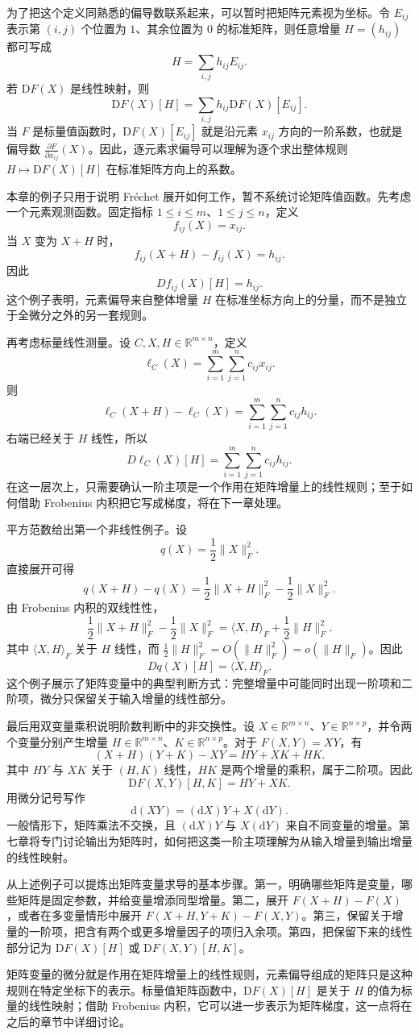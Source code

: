 为了把这个定义同熟悉的偏导数联系起来，可以暂时把矩阵元素视为坐标。令 \(E_{ij}\) 表示第 \((i,j)\) 个位置为 \(1\)、其余位置为 \(0\) 的标准矩阵，则任意增量 \(H=(h_{ij})\) 都可写成 \[H=\sum_{i,j}h_{ij}E_{ij}.\]
若 \(\mathrm{D}F(X)\) 是线性映射，则
\[
\mathrm{D}F(X)[H]=\sum_{i,j}h_{ij}\mathrm{D}F(X)[E_{ij}].
\]
当 \(F\) 是标量值函数时，\(\mathrm{D}F(X)[E_{ij}]\) 就是沿元素 \(x_{ij}\) 方向的一阶系数，也就是偏导数 \(\frac{\partial F}{\partial x_{ij}}(X)\)。因此，逐元素求偏导可以理解为逐个求出整体规则 \(H\mapsto \mathrm{D}F(X)[H]\) 在标准矩阵方向上的系数。

本章的例子只用于说明 Fréchet 展开如何工作，暂不系统讨论矩阵值函数。先考虑一个元素观测函数。固定指标 \(1\le i\le m\)、\(1\le j\le n\)，定义
\[
f_{ij}(X)=x_{ij}.
\]
当 \(X\) 变为 \(X+H\) 时，
\[
f_{ij}(X+H)-f_{ij}(X)=h_{ij}.
\]
因此
\[
Df_{ij}(X)[H]=h_{ij}.
\]
这个例子表明，元素偏导来自整体增量 \(H\) 在标准坐标方向上的分量，而不是独立于全微分之外的另一套规则。

再考虑标量线性测量。设 \(C,X,H\in\mathbb{R}^{m\times n}\)，定义
\[
\ell_C(X)=\sum_{i=1}^m\sum_{j=1}^n c_{ij}x_{ij}.
\]
则
\[
\ell_C(X+H)-\ell_C(X)
=\sum_{i=1}^m\sum_{j=1}^n c_{ij}h_{ij}.
\]
右端已经关于 \(H\) 线性，所以
\[
D\ell_C(X)[H]=\sum_{i=1}^m\sum_{j=1}^n c_{ij}h_{ij}.
\]
在这一层次上，只需要确认一阶主项是一个作用在矩阵增量上的线性规则；至于如何借助 Frobenius 内积把它写成梯度，将在下一章处理。

平方范数给出第一个非线性例子。设
\[
q(X)=\frac12\|X\|_F^2.
\]
直接展开可得
\[
q(X+H)-q(X)
=\frac12\|X+H\|_F^2-\frac12\|X\|_F^2.
\]
由 Frobenius 内积的双线性性，
\[
\frac12\|X+H\|_F^2-\frac12\|X\|_F^2
=\langle X,H\rangle_F+\frac12\|H\|_F^2.
\]
其中 \(\langle X,H\rangle_F\) 关于 \(H\) 线性，而 \(\frac12\|H\|_F^2=O(\|H\|_F^2)=o(\|H\|_F)\)。因此
\[
Dq(X)[H]=\langle X,H\rangle_F.
\]
这个例子展示了矩阵变量中的典型判断方式：完整增量中可能同时出现一阶项和二阶项，微分只保留关于输入增量的线性部分。

最后用双变量乘积说明阶数判断中的非交换性。设 \(X\in\mathbb{R}^{m\times n}\)、\(Y\in\mathbb{R}^{n\times p}\)，并令两个变量分别产生增量 \(H\in\mathbb{R}^{m\times n}\)、\(K\in\mathbb{R}^{n\times p}\)。对于 \(F(X,Y)=XY\)，有
\[
(X+H)(Y+K)-XY=HY+XK+HK.
\]
其中 \(HY\) 与 \(XK\) 关于 \((H,K)\) 线性，\(HK\) 是两个增量的乘积，属于二阶项。因此
\[
\mathrm{D}F(X,Y)[H,K]=HY+XK.
\]
用微分记号写作
\[
\mathrm{d}(XY)=(\mathrm{d}X)Y+X(\mathrm{d}Y).
\]
一般情形下，矩阵乘法不交换，且 \((\mathrm{d}X)Y\) 与 \(X(\mathrm{d}Y)\) 来自不同变量的增量。第七章将专门讨论输出为矩阵时，如何把这类一阶主项理解为从输入增量到输出增量的线性映射。

从上述例子可以提炼出矩阵变量求导的基本步骤。第一，明确哪些矩阵是变量，哪些矩阵是固定参数，并给变量增添同型增量。第二，展开 \(F(X+H)-F(X)\)，或者在多变量情形中展开 \(F(X+H,Y+K)-F(X,Y)\)。第三，保留关于增量的一阶项，把含有两个或更多增量因子的项归入余项。第四，把保留下来的线性部分记为 \(\mathrm{D}F(X)[H]\) 或 \(\mathrm{D}F(X,Y)[H,K]\)。

矩阵变量的微分就是作用在矩阵增量上的线性规则，元素偏导组成的矩阵只是这种规则在特定坐标下的表示。标量值矩阵函数中，\(\mathrm{D}F(X)[H]\) 是关于 \(H\) 的值为标量的线性映射；借助 Frobenius 内积，它可以进一步表示为矩阵梯度，这一点将在之后的章节中详细讨论。
